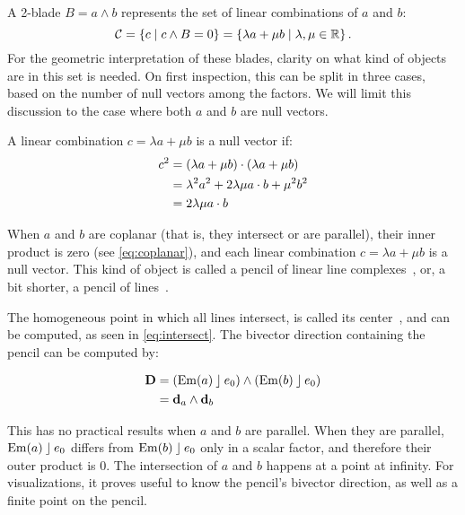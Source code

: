 %
A 2-blade $B = a \wedge b$ represents the set of linear combinations of $a$ and $b$:
\begin{equation*}
  \mathcal{C} = \left\{ c \mid c \wedge B = 0 \right\} = \left\{ \lambda a + \mu b \mid \lambda, \mu \in \mathbb{R} \right\} .
\end{equation*}
For the geometric interpretation of these blades, clarity on what kind of objects are in this set is needed.  On first inspection, this can be split in three cases, based on the number of null vectors among the factors.  We will limit this discussion to the case where both $a$ and $b$ are null vectors.

A linear combination $c = \lambda a + \mu b$ is a null vector if:
\begin{align}
  \label{eq:lincombnull}
  c^2 &= (\lambda a + \mu b) \mathbin{\cdot} (\lambda a + \mu b) \nonumber \\
  &= \lambda^2 a^2 + 2 \lambda \mu a \mathbin{\cdot} b + \mu^2 b^2 \nonumber \\
  &= 2 \lambda \mu a \mathbin{\cdot} b
\end{align}

When $a$ and $b$ are coplanar (that is, they intersect or are parallel), their inner product is zero (see \autoref{eq:coplanar}), and each linear combination $c = \lambda a + \mu b$ is a null vector.  This kind of object is called a pencil of linear line complexes~\cite[Section 3.2.1]{Pottmann}, or, a bit shorter, a pencil of lines~\cite{Hongbo}.

The homogeneous point in which all lines intersect, is called its center~\cite{Hongbo}, and can be computed, as seen in \autoref{eq:intersect}.  The bivector direction containing the pencil can be computed by:

\begin{align*}
  \mathbf{D} &= \left(\operatorname{Em}(a) \mathbin{\rfloor} e_0 \right) \wedge \left(\operatorname{Em}(b) \mathbin{\rfloor} e_0\right) \\
  &= \mathbf{d}_a \wedge \mathbf{d}_b 
\end{align*}

This has no practical results when $a$ and $b$ are parallel.  When they are parallel, $\operatorname{Em}(a) \mathbin{\rfloor} e_0$ differs from $\operatorname{Em}(b) \mathbin{\rfloor} e_0$ only in a scalar factor, and therefore their outer product is $0$.  The intersection of $a$ and $b$ happens at a point at infinity.  For visualizations, it proves useful to know the pencil's bivector direction, as well as a finite point on the pencil.  

